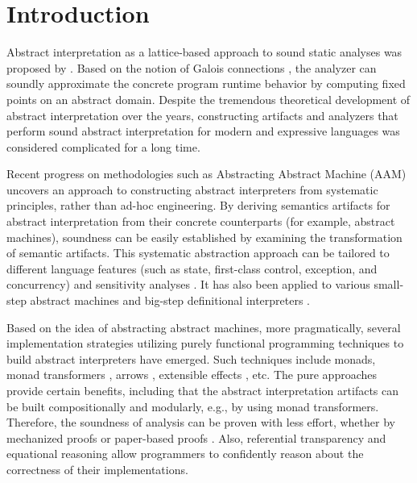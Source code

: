 \section{Introduction} \label{intro}

Abstract interpretation as a lattice-based approach to sound static analyses was
proposed by \citet{DBLP:conf/popl/CousotC77}. Based on the notion of Galois
connections \cite{CousotCousot79-1}, the analyzer can soundly approximate the
concrete program runtime behavior by computing fixed points on an abstract
domain. Despite the tremendous theoretical development of abstract
interpretation over the years, constructing artifacts and analyzers that perform
sound abstract interpretation for modern and expressive languages was considered
complicated for a long time.

Recent progress on methodologies such as Abstracting Abstract
Machine (AAM) \cite{DBLP:journals/jfp/HornM12, DBLP:conf/icfp/HornM10}
uncovers an approach to constructing abstract interpreters from
systematic principles, rather than ad-hoc engineering.  By deriving
semantics artifacts for abstract interpretation from their concrete
counterparts (for example, abstract machines), soundness can be
easily established by examining the transformation of semantic
artifacts.
This systematic abstraction approach can be tailored to different
language features (such as state, first-class control, exception, and
concurrency) and sensitivity analyses \cite{DBLP:conf/icfp/Gilray0M16,
  DBLP:conf/popl/GilrayL0MH16, Darais:2015:GTM:2814270.2814308}. It
has also been applied to various small-step abstract machines
\cite{DBLP:journals/jfp/HornM12, DBLP:conf/icfp/HornM10,
  Sergey:2013:MAI:2491956.2491979} and big-step definitional
interpreters \cite{Wei:2018:RAA:3243631.3236800,
  DBLP:journals/pacmpl/DaraisLNH17, Keidel:2018:CSP:3243631.3236767}.

Based on the idea of abstracting abstract machines, more
pragmatically, several implementation strategies utilizing purely
functional programming techniques to build abstract interpreters have
emerged. Such techniques include monads, monad transformers
\cite{DBLP:journals/pacmpl/DaraisLNH17,
  Sergey:2013:MAI:2491956.2491979}, arrows
\cite{Keidel:2018:CSP:3243631.3236767}, extensible effects
\cite{Kiselyov:2015:FMM:2804302.2804319}, etc. The pure approaches provide certain
benefits, including that the abstract interpretation artifacts can be
built compositionally and modularly, e.g., by using monad
transformers. Therefore, the soundness of analysis can be proven with
less effort, whether by mechanized proofs
\cite{Darais:2016:CGC:2951913.2951934} or paper-based proofs
\cite{Keidel:2018:CSP:3243631.3236767}.  Also, referential
transparency and equational reasoning allow programmers to
confidently reason about the correctness of their implementations.

